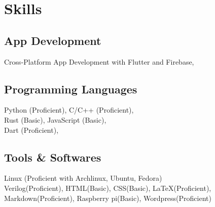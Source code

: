 \documentclass[]{m abbas resume' 2022}
\begin{document}
\begin{minipage}[t]{0.53\textwidth}
    
    


\section{Skills}
\subsection{App Development}
Cross-Platform App Development with Flutter and Firebase,

\subsection{Programming Languages}
Python (Proficient), 
C/C++ (Proficient), \\
Rust (Basic),
JavaScript (Basic),\\ 
Dart (Proficient), 

\subsection{Tools \& Softwares}
Linux (Proficient with Archlinux, Ubuntu, Fedora) \\ 
Verilog(Proficient), 
HTML(Basic),
CSS(Basic),
LaTeX(Proficient),
Markdown(Proficient), 
Raspberry pi(Basic), 
Wordpress(Proficient) \\



%
%

\end{minipage} 
\end{document}

